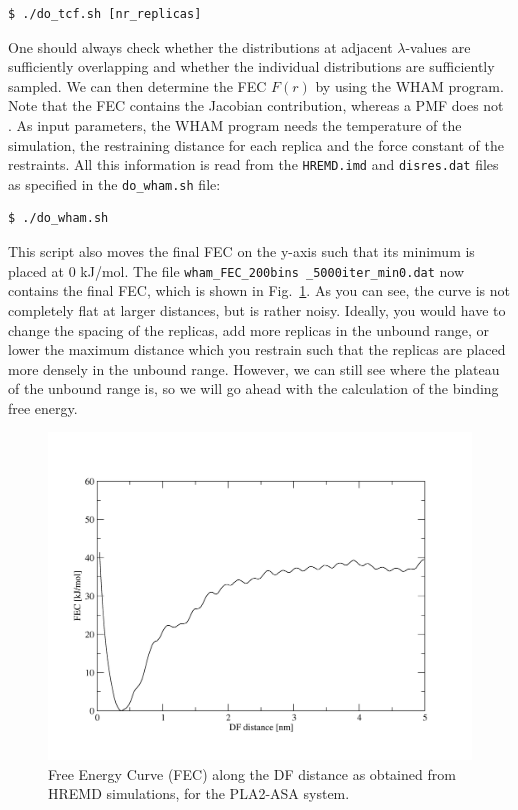 \begin{lstlisting}
$ ./do_tcf.sh [nr_replicas]
\end{lstlisting}
One should always check whether the distributions at adjacent $\lambda$-values are sufficiently overlapping and whether the individual distributions are sufficiently sampled.
We can then determine the FEC $F(r)$ by using the WHAM program. 
Note that the FEC contains the Jacobian contribution, whereas a PMF does not \cite{Trzesniak_2007}. 
As input parameters, the WHAM program needs the temperature of the simulation, the restraining distance for each replica and the force constant of the restraints. 
All this information is read from the \texttt{HREMD.imd} and \texttt{disres.dat} files as specified in the \texttt{do\_wham.sh} file:
\begin{lstlisting}
$ ./do_wham.sh
\end{lstlisting}
This script also moves the final FEC on the y-axis such that its minimum is placed at 0 kJ/mol.
The file \texttt{wham\_FEC\_200bins \_5000iter\_min0.dat} now contains the final FEC, which is shown in Fig.~\ref{FEC}. As you can see, the curve is not completely flat at larger distances, but is rather noisy. Ideally, you would have to change the spacing of the replicas, add more replicas in the unbound range, or lower the maximum distance which you restrain such that the replicas are placed more densely in the unbound range. 
However, we can still see where the plateau of the unbound range is, so we will go ahead with the calculation of the binding free energy.

\begin{figure}[H]
\centering
\includegraphics[scale=.3]{../06_tutorial_03/figures/FEC}
\caption{Free Energy Curve (FEC) along the DF distance as obtained from HREMD simulations, for the PLA2-ASA system.}
\label{FEC}
\end{figure}

